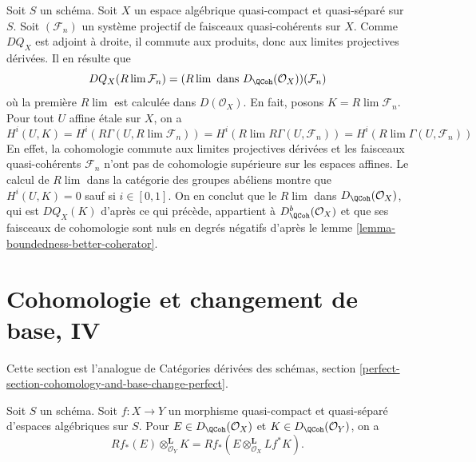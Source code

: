 \begin{example}
\label{example-inverse-limit-quasi-coherent}
Soit $S$ un schéma.
Soit $X$ un espace algébrique quasi-compact et quasi-séparé sur $S$.
Soit $(\mathcal{F}_n)$
un système projectif de faisceaux quasi-cohérents sur $X$.
Comme $DQ_X$ est adjoint à droite, il commute aux
produits, donc aux limites projectives dérivées.
Il en résulte que
$$
DQ_X(R\lim \mathcal{F}_n) =
(R\lim\text{ dans }D_\QCoh(\mathcal{O}_X))(\mathcal{F}_n)
$$
où la première $R\lim$ est calculée dans $D(\mathcal{O}_X)$.
En fait, posons $K = R\lim \mathcal{F}_n$.
Pour tout $U$ affine étale sur $X$, on a
$$
H^i(U, K) =
H^i(R\Gamma(U, R\lim \mathcal{F}_n)) =
H^i(R\lim R\Gamma(U, \mathcal{F}_n)) =
H^i(R\lim \Gamma(U, \mathcal{F}_n))
$$
En effet, la cohomologie commute aux limites projectives dérivées et les
faisceaux quasi-cohérents
$\mathcal{F}_n$ n'ont pas de cohomologie supérieure sur les espaces affines.
Le calcul de $R\lim$ dans la catégorie des
groupes abéliens montre que $H^i(U, K) = 0$
sauf si $i \in [0, 1]$. On en conclut que
le $R\lim$ dans $D_\QCoh(\mathcal{O}_X)$, qui est
$DQ_X(K)$ d'après ce qui précède, appartient à $D^b_\QCoh(\mathcal{O}_X)$
et que ses faisceaux de cohomologie sont nuls en degrés négatifs
d'après le lemme \ref{lemma-boundedness-better-coherator}.
\end{example}

\section{Cohomologie et changement de base, IV}
\label{section-cohomology-and-base-change-perfect}

\noindent
Cette section est l'analogue de Cat\'egories d\'eriv\'ees des sch\'emas,
section \ref{perfect-section-cohomology-and-base-change-perfect}.

\begin{lemma}
\label{lemma-cohomology-base-change}
Soit $S$ un sch\'ema. Soit $f:X\to Y$ un morphisme quasi-compact et
quasi-s\'epar\'e d'espaces alg\'ebriques sur $S$. Pour
$E\in D_\QCoh(\mathcal{O}_X)$ et $K\in D_\QCoh(\mathcal{O}_Y)$, on a
$$
Rf_*(E) \otimes_{\mathcal{O}_Y}^\mathbf{L} K =
Rf_*(E \otimes_{\mathcal{O}_X}^\mathbf{L} Lf^*K).
$$
\end{lemma}

